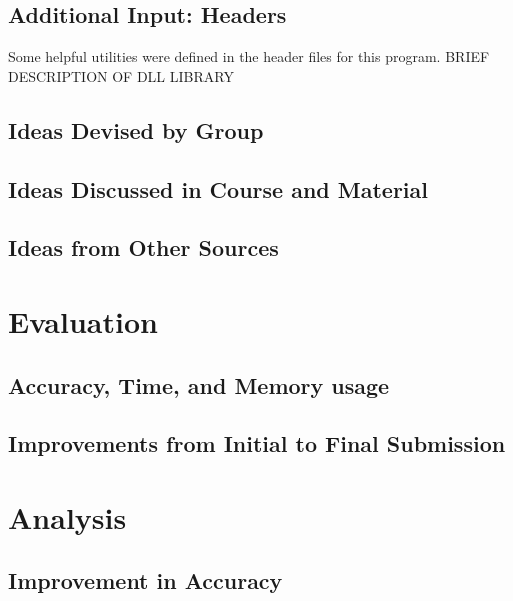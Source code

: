 \documentclass[journal, a4paper]{IEEEtran}
\begin{document}
\subsection{Additional Input: Headers}
Some helpful utilities were defined in the header files for this program.
BRIEF DESCRIPTION OF DLL LIBRARY

\subsection{Ideas Devised by Group}




\subsection{Ideas Discussed in Course and Material}


\subsection{Ideas from Other Sources}

\section{Evaluation}

\subsection{Accuracy, Time, and Memory usage}

\subsection{Improvements from Initial to Final Submission}
	
\section{Analysis}

\subsection{Improvement in Accuracy}
\end{document}

